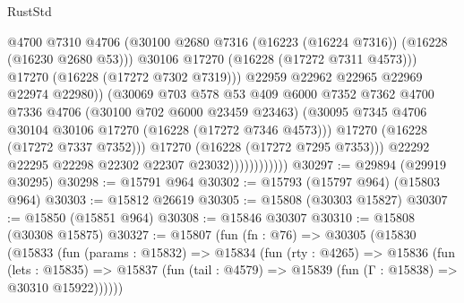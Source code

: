 \begin{lexlean}{RustStd}
\begin{coremodule}
                                      @4700
                                      @7310
                                      @4706
                                      (@30100
                                        @2680
                                        @7316
                                        (@16223 (@16224 @7316))
                                        (@16228 (@16230 @2680 @53)))
                                      @30106
                                      @17270
                                      (@16228 (@17272 @7311 @4573)))
                                    @17270
                                    (@16228 (@17272 @7302 @7319)))
                                  @22959
                                  @22962
                                  @22965
                                  @22969
                                  @22974
                                  @22980))
                              (@30069
                                @703
                                @578
                                @53
                                @409
                                @6000
                                @7352
                                @7362
                                @4700
                                @7336
                                @4706
                                (@30100 @702 @6000 @23459 @23463)
                                (@30095
                                  @7345
                                  @4706
                                  @30104
                                  @30106
                                  @17270
                                  (@16228 (@17272 @7346 @4573)))
                                @17270
                                (@16228 (@17272 @7337 @7352)))
                              @17270
                              (@16228 (@17272 @7295 @7353)))
                            @22292
                            @22295
                            @22298
                            @22302
                            @22307
                            @23032))))))))))))
@30297 := @29894 (@29919 @30295)
@30298 := @15791 @964
@30302 := @15793 (@15797 @964) (@15803 @964)
@30303 := @15812 @26619
@30305 := @15808 (@30303 @15827)
@30307 := @15850 (@15851 @964)
@30308 := @15846 @30307
@30310 := @15808 (@30308 @15875)
@30327 := @15807
    (fun (fn : @76) =>
    @30305
      (@15830
        (@15833
          (fun (params : @15832) =>
          @15834
            (fun (rty : @4265) =>
            @15836
              (fun (lets : @15835) =>
              @15837 (fun (tail : @4579) => @15839 (fun (Γ : @15838) => @30310 @15922))))))

\end{coremodule}
\end{lexlean}
